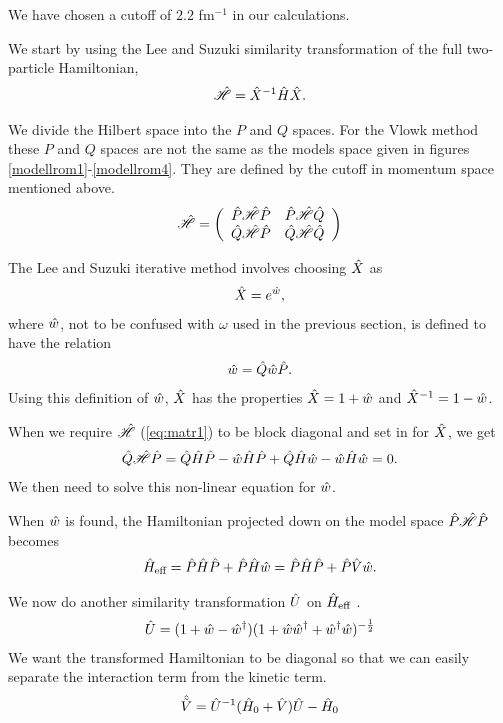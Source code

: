 We have chosen a cutoff of $2.2$ fm$^{-1}$ in our calculations.

We start by using the Lee and Suzuki similarity transformation of the full two-particle Hamiltonian,
\begin{align}
	\hat{\mathscr{H}} = \hat{X}^{-1}\hat{H}\hat{X}.
\end{align}

We divide the Hilbert space into the $P$ and $Q$ spaces. For the Vlowk method
these $P$ and $Q$ spaces are not the same as the models space given in figures
\ref{modellrom1}-\ref{modellrom4}. They are defined by the cutoff in momentum
space mentioned above.
\begin{equation}
	\H =
	\left(
	\begin{array}{cc}
		\p\H\p & \p\H\q \\
		\q\H\p & \q\H\q \\
	\end{array}
	\right)
	\label{eq:matr1}
\end{equation}

The Lee and Suzuki iterative method involves choosing $\hat{X}$ as
\begin{align}
	\hat{X} = e^{\hat{w}},
\end{align}
where $\hat{w}$, not to be confused with $\omega$ used in the previous section, is
defined to have the relation
\begin{align}
	\hat{w} = \hat{Q}\hat{w}\hat{P}.
\end{align}
Using this definition of $\hat{w}$, $\hat{X}$ has the properties $\hat{X} = 1+\hat{w}$ and
$\hat{X}^{-1} = 1-\hat{w}$.

When we require $\hat{\mathscr{H}}$ (\ref{eq:matr1}) to be block diagonal and set in for $\hat{X}$,
we get
\begin{align}
	\q\H\p = \q\h\p-\w\h\p+\q\h\w-\w\h\w = 0.
	\label{eq:QHP}
\end{align}
We then need to solve this non-linear equation for $\hat{w}$.

When $\hat{w}$ is found, the Hamiltonian projected down on the model space $\hat{P}\hat{\mathscr{H}}\hat{P}$
becomes
\begin{align}
	\he = \p\h\p+\p\h\w = \p\h\p+\p\v\w.
	\label{eq:Heff}
\end{align}

We now do another similarity transformation $\hat{U}$ on $\hat{H}_{\textrm{eff}}$ \citep{VlowkU}.
\begin{align}
	\u = (1+\w-\w^\dagger)(1+\w\w^\dagger+\w^\dagger\w)^{-\frac12}
	\label{eq:U}
\end{align}
We want the transformed Hamiltonian to be diagonal so that we can easily separate the interaction term from the kinetic term.
\begin{align}
	\vv = \u^{-1}(\h_0+\v)\u-\h_0
	\label{eq:V1}
\end{align}

